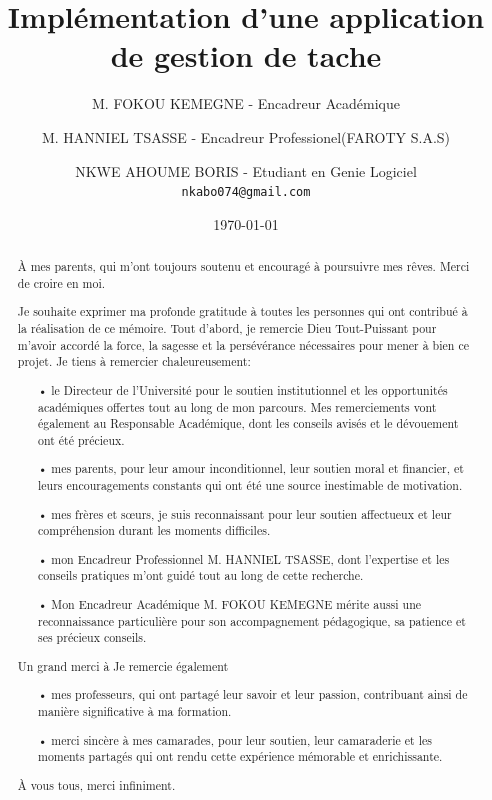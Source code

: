 \documentclass[a4paper,12pt]{report}
\title{Implémentation d'une application de gestion de tache}
\author{
  M. FOKOU KEMEGNE - Encadreur Académique\\
  \and
  M. HANNIEL TSASSE - Encadreur Professionel(FAROTY S.A.S)\\
  \and
  NKWE AHOUME BORIS - Etudiant en Genie Logiciel\\
  \texttt{nkabo074@gmail.com}
}
\date{\today}
\begin{document}
\vspace{0.06cm}

\maketitle

\def\chaptername{Chapitre}%
\def\listfigurename{Liste des figures}
\def\contentsname{Somaire}


\renewcommand{\abstractname}{Dedicace}
\begin{abstract}
À mes parents, qui m'ont toujours soutenu et encouragé à poursuivre mes rêves. Merci de croire en moi.
\end{abstract}

\renewcommand{\abstractname}{Remerciment}
\begin{abstract}
Je souhaite exprimer ma profonde gratitude à toutes les personnes qui ont contribué à la réalisation de ce mémoire. Tout d'abord, je remercie Dieu Tout-Puissant pour m'avoir accordé la force, la sagesse et la persévérance nécessaires pour mener à bien ce projet.
Je tiens à remercier chaleureusement:

\begin{itemize}
  \item[•] le Directeur de l'Université pour le soutien institutionnel et les opportunités académiques offertes tout au long de mon parcours. Mes remerciements vont également au Responsable Académique, dont les conseils avisés et le dévouement ont été précieux.
  \item[•] mes parents, pour leur amour inconditionnel, leur soutien moral et financier, et leurs encouragements constants qui ont été une source inestimable de motivation.
  \item[•] mes frères et sœurs, je suis reconnaissant pour leur soutien affectueux et leur compréhension durant les moments difficiles.
  \item[•] mon Encadreur Professionnel M. HANNIEL TSASSE, dont l'expertise et les conseils pratiques m'ont guidé tout au long de cette recherche. 
  \item[•]Mon Encadreur Académique M. FOKOU KEMEGNE mérite aussi une reconnaissance particulière pour son accompagnement pédagogique, sa patience et ses précieux conseils.
\end{itemize}

Un grand merci à 
Je remercie également

\begin{itemize}
  \item[•] mes professeurs, qui ont partagé leur savoir et leur passion, contribuant ainsi de manière significative à ma formation.
  \item[•] merci sincère à mes camarades, pour leur soutien, leur camaraderie et les moments partagés qui ont rendu cette expérience mémorable et enrichissante.
\end{itemize}

À vous tous, merci infiniment.
\end{abstract}
\end{document}
